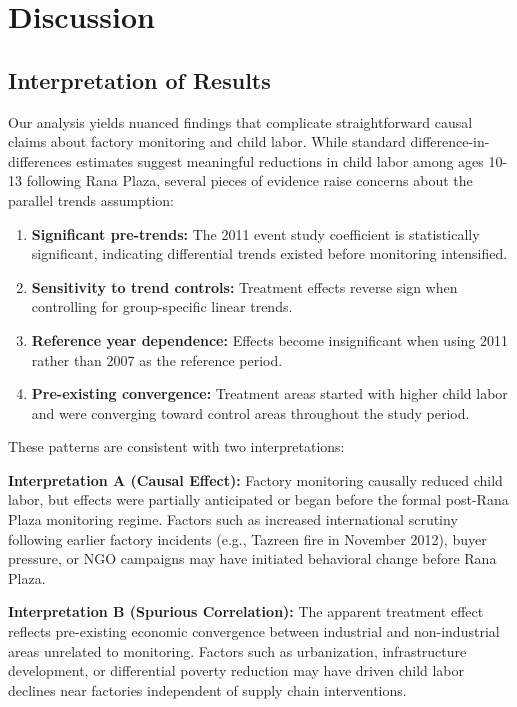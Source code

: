 \section{Discussion}

\subsection{Interpretation of Results}

Our analysis yields nuanced findings that complicate straightforward causal claims about factory monitoring and child labor. While standard difference-in-differences estimates suggest meaningful reductions in child labor among ages 10-13 following Rana Plaza, several pieces of evidence raise concerns about the parallel trends assumption:

\begin{enumerate}
\item \textbf{Significant pre-trends:} The 2011 event study coefficient is statistically significant, indicating differential trends existed before monitoring intensified.

\item \textbf{Sensitivity to trend controls:} Treatment effects reverse sign when controlling for group-specific linear trends.

\item \textbf{Reference year dependence:} Effects become insignificant when using 2011 rather than 2007 as the reference period.

\item \textbf{Pre-existing convergence:} Treatment areas started with higher child labor and were converging toward control areas throughout the study period.
\end{enumerate}

These patterns are consistent with two interpretations:

\textbf{Interpretation A (Causal Effect):} Factory monitoring causally reduced child labor, but effects were partially anticipated or began before the formal post-Rana Plaza monitoring regime. Factors such as increased international scrutiny following earlier factory incidents (e.g., Tazreen fire in November 2012), buyer pressure, or NGO campaigns may have initiated behavioral change before Rana Plaza.

\textbf{Interpretation B (Spurious Correlation):} The apparent treatment effect reflects pre-existing economic convergence between industrial and non-industrial areas unrelated to monitoring. Factors such as urbanization, infrastructure development, or differential poverty reduction may have driven child labor declines near factories independent of supply chain interventions.

